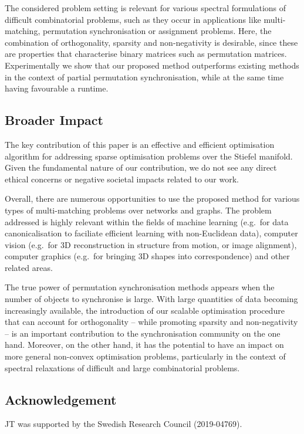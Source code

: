 \documentclass{article}
\begin{document}
The considered problem setting is relevant for various spectral formulations of difficult combinatorial problems, such as they occur in applications like multi-matching, permutation synchronisation or assignment problems. Here, the combination of orthogonality, sparsity and non-negativity is desirable, since these are properties that characterise binary matrices such as permutation matrices.
%
%
%
Experimentally we show that our proposed method outperforms existing methods in the context of partial permutation synchronisation, while at the same time having favourable a runtime. 


 
\subsection*{Broader Impact}\label{sec:impact}
The key contribution of this paper is an effective and efficient optimisation algorithm for addressing sparse optimisation problems over the Stiefel manifold. Given the fundamental nature of our contribution, we do not see any direct ethical concerns or negative societal impacts related to our work.

Overall, there are numerous opportunities to use the proposed method for various types of multi-matching problems over networks and graphs.
%
The problem addressed is highly relevant within the fields of machine learning (e.g.~for data canonicalisation to faciliate efficient learning with non-Euclidean data), computer vision (e.g.~for 3D reconstruction in structure from motion, or image alignment), computer graphics (e.g.~for bringing 3D shapes into correspondence) and other related areas. 

The true power of permutation synchronisation methods appears when the number of objects to synchronise is large.
%
With large quantities of data
%
becoming increasingly available,
%
the introduction of our scalable optimisation procedure
that can account for orthogonality -- while promoting sparsity and non-negativity -- is  an important contribution to the synchronisation community on the one hand. Moreover, on the other hand,  it has the potential to have an impact on more general non-convex optimisation problems, particularly in the context of spectral relaxations of difficult and large combinatorial problems.


\subsection*{Acknowledgement}
JT was supported by the Swedish Research Council (2019-04769).
%
\end{document}
